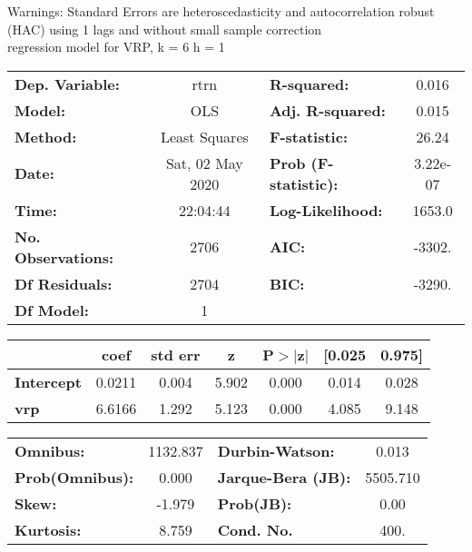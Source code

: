 Warnings: \newline
 [1] Standard Errors are heteroscedasticity and autocorrelation robust (HAC) using 1 lags and without small sample correction\\ 

regression model for VRP, k = 6 h = 1\begin{center}
\begin{tabular}{lclc}
\toprule
\textbf{Dep. Variable:}    &       rtrn       & \textbf{  R-squared:         } &     0.016   \\
\textbf{Model:}            &       OLS        & \textbf{  Adj. R-squared:    } &     0.015   \\
\textbf{Method:}           &  Least Squares   & \textbf{  F-statistic:       } &     26.24   \\
\textbf{Date:}             & Sat, 02 May 2020 & \textbf{  Prob (F-statistic):} &  3.22e-07   \\
\textbf{Time:}             &     22:04:44     & \textbf{  Log-Likelihood:    } &    1653.0   \\
\textbf{No. Observations:} &        2706      & \textbf{  AIC:               } &    -3302.   \\
\textbf{Df Residuals:}     &        2704      & \textbf{  BIC:               } &    -3290.   \\
\textbf{Df Model:}         &           1      & \textbf{                     } &             \\
\bottomrule
\end{tabular}
\begin{tabular}{lcccccc}
                   & \textbf{coef} & \textbf{std err} & \textbf{z} & \textbf{P$> |$z$|$} & \textbf{[0.025} & \textbf{0.975]}  \\
\midrule
\textbf{Intercept} &       0.0211  &        0.004     &     5.902  &         0.000        &        0.014    &        0.028     \\
\textbf{vrp}       &       6.6166  &        1.292     &     5.123  &         0.000        &        4.085    &        9.148     \\
\bottomrule
\end{tabular}
\begin{tabular}{lclc}
\textbf{Omnibus:}       & 1132.837 & \textbf{  Durbin-Watson:     } &    0.013  \\
\textbf{Prob(Omnibus):} &   0.000  & \textbf{  Jarque-Bera (JB):  } & 5505.710  \\
\textbf{Skew:}          &  -1.979  & \textbf{  Prob(JB):          } &     0.00  \\
\textbf{Kurtosis:}      &   8.759  & \textbf{  Cond. No.          } &     400.  \\
\bottomrule
\end{tabular}
\end{center}

